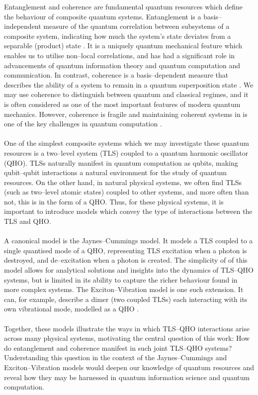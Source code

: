 \documentclass[11pt]{article}
\begin{document}
Entanglement and coherence are fundamental quantum resources which define the behaviour of composite quantum systems. Entanglement is a basis--independent measure of the quantum correlation between subsystems of a
composite system, indicating how much the system’s state deviates from a separable (product) state \cite{Entanglement2009-Definition}. It is a uniquely quantum mechanical feature which enables us to utilise non--local correlations, and has had a significant role in advancements of quantum information theory and quantum computation and communication. In contrast, coherence is a basis--dependent measure that describes the ability of a system to remain in a quantum superposition state \cite{Coherence2017-Colloquium}. We may use coherence to distinguish between quantum and classical regimes, and it is often considered as one of the most important features of modern quantum mechanics. However, coherence is fragile and maintaining coherent systems in is one of the key challenges in quantum computation \cite{OQS2019_decoherence}. \\
\\
One of the simplest composite systems which we may investigate these quantum resources is a two--level system (TLS) coupled to a quantum harmonic oscillator (QHO). TLSs naturally manifest in quantum computation as qubits, making qubit–qubit interactions a natural environment for the study of quantum resources. On the other hand, in natural physical systems, we often find TLSs (such as two--level atomic states) coupled to other systems, and more often than not, this is in the form of a QHO. Thus, for these physical systems, it is important to introduce models which convey the type of interactions between the TLS and QHO.\\
\\
A canonical model is the Jaynes--Cummings model. It models a TLS coupled to a single quantised mode of a QHO, representing TLS excitation when a photon is destroyed, and de--excitation when a photon is created. The simplicity of of this model allows for analytical solutions and insights into the dynamics of TLS--QHO systems, but is limited in its ability to capture the richer behaviour found in more complex systems. The Exciton–Vibration model is one such extension. It can, for example, describe a dimer (two coupled TLSs) each interacting with its own vibrational mode, modelled as a QHO \cite{ExVib2014-Alexandra}.\\
\\
Together, these models illustrate the ways in which TLS–QHO interactions arise across many physical systems, motivating the central question of this work: How do entanglement and coherence manifest in such joint TLS--QHO systems? Understanding this question in the context of the Jaynes--Cummings and Exciton--Vibration models would deepen our knowledge of quantum resources and reveal how they may be harnessed in quantum information science and quantum computation. \\
\end{document}
